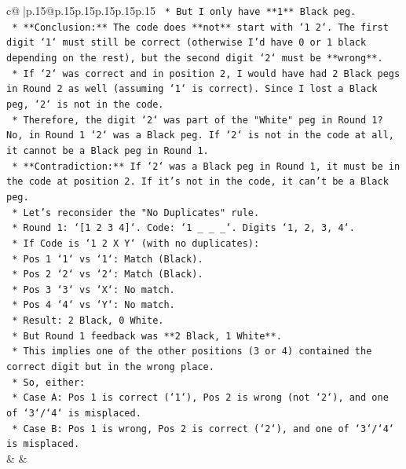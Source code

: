 \documentclass{article}
\begin{document}
{\begin{supertabular}{c@{$\;$}|p{.15\linewidth}@{}p{.15\linewidth}p{.15\linewidth}p{.15\linewidth}p{.15\linewidth}p{.15\linewidth}}
{{{\texttt{        *   But I only have **1** Black peg.} \\
\texttt{        *   **Conclusion:** The code does **not** start with `1 2`. The first digit `1` must still be correct (otherwise I'd have 0 or 1 black depending on the rest), but the second digit `2` must be **wrong**.} \\
\texttt{        *   If `2` was correct and in position 2, I would have had 2 Black pegs in Round 2 as well (assuming `1` is correct). Since I lost a Black peg, `2` is not in the code.} \\
\texttt{        *   Therefore, the digit `2` was part of the "White" peg in Round 1? No, in Round 1 `2` was a Black peg. If `2` is not in the code at all, it cannot be a Black peg in Round 1.} \\
\texttt{        *   **Contradiction:** If `2` was a Black peg in Round 1, it must be in the code at position 2. If it's not in the code, it can't be a Black peg.} \\
\texttt{        *   Let's reconsider the "No Duplicates" rule.} \\
\texttt{        *   Round 1: `{[}1 2 3 4{]}`. Code: `1 \_ \_ \_`. Digits `1, 2, 3, 4`.} \\
\texttt{        *   If Code is `1 2 X Y` (with no duplicates):} \\
\texttt{            *   Pos 1 `1` vs `1`: Match (Black).} \\
\texttt{            *   Pos 2 `2` vs `2`: Match (Black).} \\
\texttt{            *   Pos 3 `3` vs `X`: No match.} \\
\texttt{            *   Pos 4 `4` vs `Y`: No match.} \\
\texttt{            *   Result: 2 Black, 0 White.} \\
\texttt{        *   But Round 1 feedback was **2 Black, 1 White**.} \\
\texttt{        *   This implies one of the other positions (3 or 4) contained the correct digit but in the wrong place.} \\
\texttt{        *   So, either:} \\
\texttt{            *   Case A: Pos 1 is correct (`1`), Pos 2 is wrong (not `2`), and one of `3`/`4` is misplaced.} \\
\texttt{            *   Case B: Pos 1 is wrong, Pos 2 is correct (`2`), and one of `3`/`4` is misplaced.} \\
            }
        }
    }
    & & \\ \\


\end{supertabular}}
\end{document}
